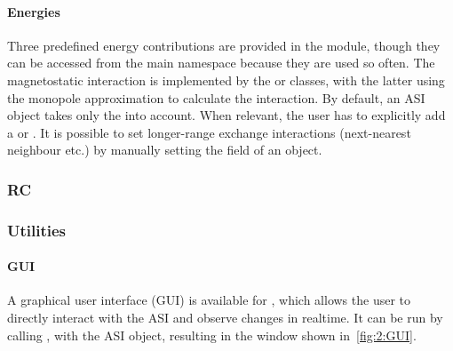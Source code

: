 \paragraph{Energies}\label{sec:2:API_energies}
Three predefined energy contributions are provided in the  module, though they can be accessed from the main  namespace because they are used so often.
The magnetostatic interaction is implemented by the  or  classes, with the latter using the monopole approximation to calculate the interaction.
By default, an ASI object takes only the  into account.
When relevant, the user has to explicitly add a  or .
It is possible to set longer-range exchange interactions (next-nearest neighbour etc.) by manually setting the  field of an  object.
\subsubsection{RC} %
\subsubsection{Utilities} %
\paragraph{GUI}
A graphical user interface (GUI) is available for \hotspice, which allows the user to directly interact with the ASI and observe changes in realtime. It can be run by calling , with  the ASI object, resulting in the window shown in~\cref{fig:2:GUI}.


